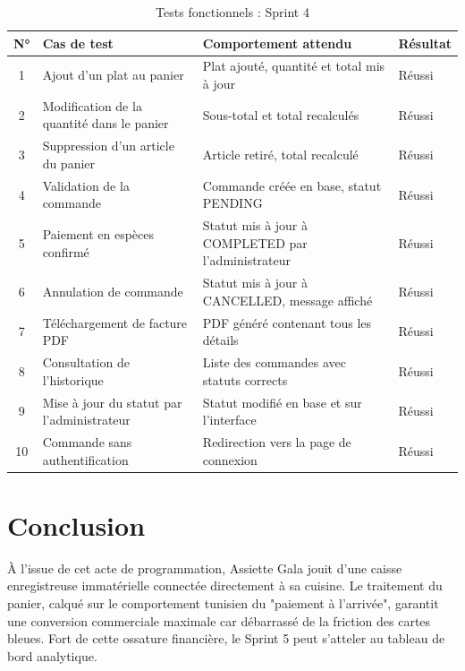 \begin{table}[H]
    \centering
    \caption{Tests fonctionnels : Sprint 4}
    \label{tab:tests_sprint4}
    \renewcommand{\arraystretch}{1.3}
    \begin{tabular}{|c|p{3cm}|p{3.5cm}|p{2.5cm}|}
        \hline
        \textbf{N°} & \textbf{Cas de test} & \textbf{Comportement attendu} & \textbf{Résultat} \\
        \hline
        1 & Ajout d'un plat au panier & Plat ajouté, quantité et total mis à jour & Réussi \\
        \hline
        2 & Modification de la quantité dans le panier & Sous-total et total recalculés & Réussi \\
        \hline
        3 & Suppression d'un article du panier & Article retiré, total recalculé & Réussi \\
        \hline
        4 & Validation de la commande & Commande créée en base, statut PENDING & Réussi \\
        \hline
        5 & Paiement en espèces confirmé & Statut mis à jour à COMPLETED par l'administrateur & Réussi \\
        \hline
        6 & Annulation de commande & Statut mis à jour à CANCELLED, message affiché & Réussi \\
        \hline
        7 & Téléchargement de facture PDF & PDF généré contenant tous les détails & Réussi \\
        \hline
        8 & Consultation de l'historique & Liste des commandes avec statuts corrects & Réussi \\
        \hline
        9 & Mise à jour du statut par l'administrateur & Statut modifié en base et sur l'interface & Réussi \\
        \hline
        10 & Commande sans authentification & Redirection vers la page de connexion & Réussi \\
        \hline
    \end{tabular}
\end{table}

\section*{Conclusion}

\begin{samepage}
À l'issue de cet acte de programmation, Assiette Gala jouit d'une caisse enregistreuse immatérielle connectée directement à sa cuisine. Le traitement du panier, calqué sur le comportement tunisien du "paiement à l'arrivée", garantit une conversion commerciale maximale car débarrassé de la friction des cartes bleues. Fort de cette ossature financière, le Sprint 5 peut s'atteler au tableau de bord analytique.
\end{samepage}

